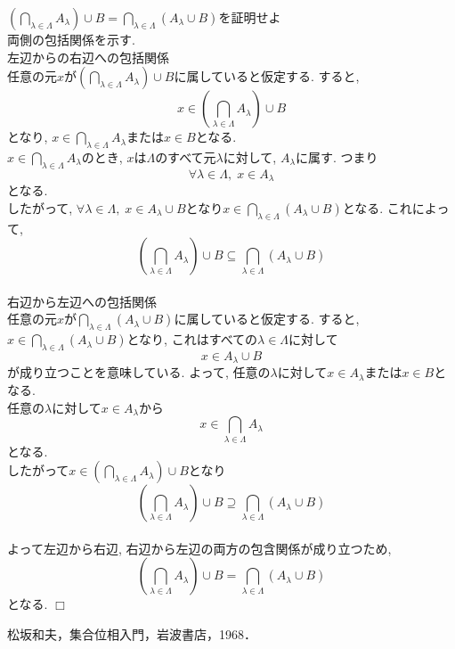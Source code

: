 \documentclass[a4j]{jsarticle}
\def \QED{\hfill $\Box$}%
\begin{document}
$\left( \bigcap_{\lambda \in \Lambda}A_\lambda \right) \cup B = \bigcap_{\lambda \in \Lambda}(A_\lambda \cup B)$を証明せよ\\

両側の包括関係を示す. \\

左辺からの右辺への包括関係\\
任意の元$x$が$\left( \bigcap_{\lambda \in \Lambda}A_\lambda \right) \cup B$に属していると仮定する. すると, $$x \in \left( \bigcap_{\lambda \in \Lambda}A_\lambda \right) \cup B$$となり, $x \in \bigcap_{\lambda \in \Lambda}A_\lambda$または$x \in B$となる. \\
$x \in \bigcap_{\lambda \in \Lambda}A_\lambda$のとき, $x$は$\Lambda$のすべて元$\lambda$に対して, $A_\lambda$に属す. つまり$$\forall \lambda \in \Lambda,\;x \in A_\lambda$$となる. \\
したがって, $\forall \lambda \in \Lambda,\;x \in A_\lambda \cup B$となり$x \in \bigcap_{\lambda \in \Lambda}(A_\lambda \cup B)$となる.
これによって, $$\left( \bigcap_{\lambda \in \Lambda}A_\lambda \right) \cup B \subseteq \bigcap_{\lambda \in \Lambda}(A_\lambda \cup B)$$\\

右辺から左辺への包括関係\\
任意の元$x$が$\bigcap_{\lambda \in \Lambda}(A_\lambda \cup B)$に属していると仮定する. すると, $x \in \bigcap_{\lambda \in \Lambda}(A_\lambda \cup B)$となり, これはすべての$\lambda \in \Lambda$に対して$$x \in A_\lambda \cup B$$が成り立つことを意味している. よって, 任意の$\lambda$に対して$x \in A_\lambda$または$x \in B$となる. \\
任意の$\lambda$に対して$x \in A_\lambda$から$$x \in \bigcap_{\lambda \in \Lambda}A_\lambda$$となる. \\
したがって$x \in \left( \bigcap_{\lambda \in \Lambda}A_\lambda \right) \cup B$となり$$\left( \bigcap_{\lambda \in \Lambda}A_\lambda \right) \cup B \supseteq \bigcap_{\lambda \in \Lambda}(A_\lambda \cup B)$$\\
よって左辺から右辺, 右辺から左辺の両方の包含関係が成り立つため, $$\left( \bigcap_{\lambda \in \Lambda}A_\lambda \right) \cup B = \bigcap_{\lambda \in \Lambda}(A_\lambda \cup B)$$となる. \QED


\begin{thebibliography}{99}
  松坂和夫，集合位相入門，岩波書店，1968．
\end{thebibliography}
\end{document}
